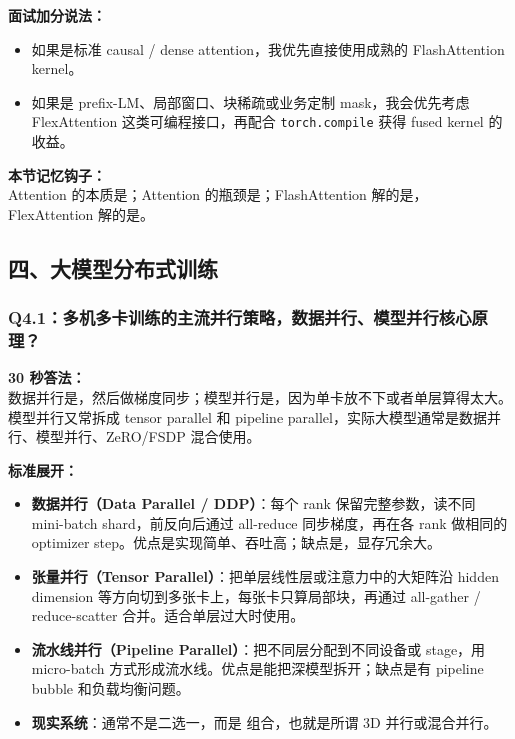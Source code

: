 \textbf{面试加分说法：}
\begin{itemize}[leftmargin=1.5em]
  \item 如果是标准 causal / dense attention，我优先直接使用成熟的 FlashAttention kernel。
  \item 如果是 prefix-LM、局部窗口、块稀疏或业务定制 mask，我会优先考虑 FlexAttention 这类可编程接口，再配合 \texttt{torch.compile} 获得 fused kernel 的收益。
\end{itemize}

\begin{summarybox}
\textbf{本节记忆钩子：}\\
Attention 的本质是；Attention 的瓶颈是；FlashAttention 解的是，FlexAttention 解的是。
\end{summarybox}

\subsection{四、大模型分布式训练}

\subsubsection{Q4.1：多机多卡训练的主流并行策略，数据并行、模型并行核心原理？}

\begin{conceptbox}
\textbf{30 秒答法：}\\
数据并行是，然后做梯度同步；模型并行是，因为单卡放不下或者单层算得太大。模型并行又常拆成 tensor parallel 和 pipeline parallel，实际大模型通常是数据并行、模型并行、ZeRO/FSDP 混合使用。
\end{conceptbox}

\textbf{标准展开：}
\begin{itemize}[leftmargin=1.5em]
  \item \textbf{数据并行（Data Parallel / DDP）}：每个 rank 保留完整参数，读不同 mini-batch shard，前反向后通过 all-reduce 同步梯度，再在各 rank 做相同的 optimizer step。优点是实现简单、吞吐高；缺点是，显存冗余大。
  \item \textbf{张量并行（Tensor Parallel）}：把单层线性层或注意力中的大矩阵沿 hidden dimension 等方向切到多张卡上，每张卡只算局部块，再通过 all-gather / reduce-scatter 合并。适合单层过大时使用。
  \item \textbf{流水线并行（Pipeline Parallel）}：把不同层分配到不同设备或 stage，用 micro-batch 方式形成流水线。优点是能把深模型拆开；缺点是有 pipeline bubble 和负载均衡问题。
  \item \textbf{现实系统}：通常不是二选一，而是  组合，也就是所谓 3D 并行或混合并行。
\end{itemize}

